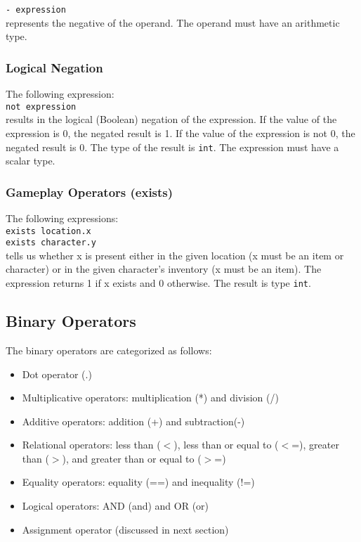 \documentclass[12pt]{article}
\begin{document}
\texttt{- expression} \\

\noindent represents the negative of the operand.  The operand must have an arithmetic type.

\subsubsection{Logical Negation}

The following expression: \\

\texttt{not expression} \\

\noindent results in the logical (Boolean) negation of the expression.  If the value of the expression is 0, the negated result is 1.  If the value of the expression is not 0, the negated result is 0.  The type of the result is \texttt{int}.  The expression must have a scalar type.

\subsubsection{Gameplay Operators (exists)}
The following expressions: \\

\texttt{exists location.x} \\
\indent \texttt{exists character.y} \\

\noindent tells us whether x is present either in the given location (x must be an item or character) or in the given character's inventory (x must be an item).  The expression returns 1 if x exists and 0 otherwise.  The result is type \texttt{int}.

\subsection{Binary Operators}
The binary operators are categorized as follows:
\begin{itemize}
\item Dot operator (.)
\item Multiplicative operators: multiplication (*) and division (/)
\item Additive operators: addition (+) and subtraction(-)
\item Relational operators: less than ($<$), less than or equal to ($<$=), greater than ($>$), and greater than or equal to ($>$=)
\item Equality operators: equality (==) and inequality (!=)
\item Logical operators: AND (and) and OR (or)
\item Assignment operator (discussed in next section) 
\end{itemize}
\end{document}

